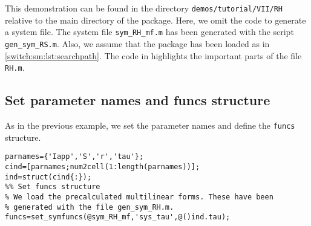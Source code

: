 \begin{remark}
	This demonstration can be found in the directory \lstinline|demos/tutorial/VII/RH| relative to the main directory of the \DDEBIFTOOL package. Here, we omit the code to generate a system file. The system file \lstinline|sym_RH_mf.m| has been generated with the script \lstinline|gen_sym_RS.m|. Also, we assume that the \DDEBIFTOOL package has been loaded as in \cref{switch:sm:lst:searchpath}. The code in  highlights the important parts of the file \lstinline|RH.m|.
\end{remark}

\subsection{Set parameter names and funcs structure} \label{switch:sm:sec:RH:pars_and_funcs}
As in the previous example, we set the parameter names and define the \lstinline|funcs| structure.
\begin{lstlisting}[style=customMatlab]
%% Set parameter names
parnames={'Iapp','S','r','tau'};
cind=[parnames;num2cell(1:length(parnames))];
ind=struct(cind{:});
%% Set funcs structure
% We load the precalculated multilinear forms. These have been
% generated with the file gen_sym_RH.m.
funcs=set_symfuncs(@sym_RH_mf,'sys_tau',@()ind.tau);
\end{lstlisting}

